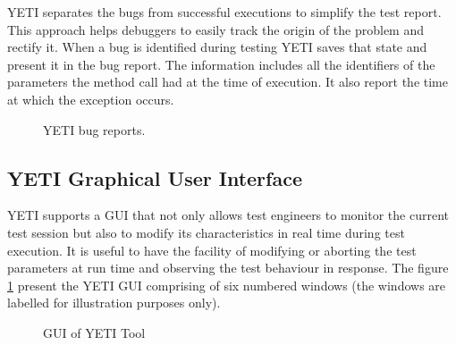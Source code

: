 YETI separates the bugs from successful executions to simplify the test report. This approach helps debuggers to easily track the origin of the problem and rectify it. When a bug is identified during testing YETI saves that state and present it in the bug report. The information includes all the identifiers of the parameters the method call had at the time of execution. It also report the time at which the exception occurs.

\begin{figure}[h]
	\centering
	\caption{YETI bug reports.}
\end{figure}

\subsection{YETI Graphical User Interface}
YETI supports a GUI that not only allows test engineers to monitor the current test session but also to modify its characteristics in real time during test execution. It is useful to have the facility of modifying or aborting the test parameters at run time and observing the test behaviour in response. The figure \ref{fig:yetiGUI} present the YETI GUI comprising of six numbered windows (the windows are labelled for illustration purposes only).

\begin{figure}[h]
	\centering
	\label{fig:yetiGUI}
	\caption{GUI of YETI Tool}
\end{figure}

